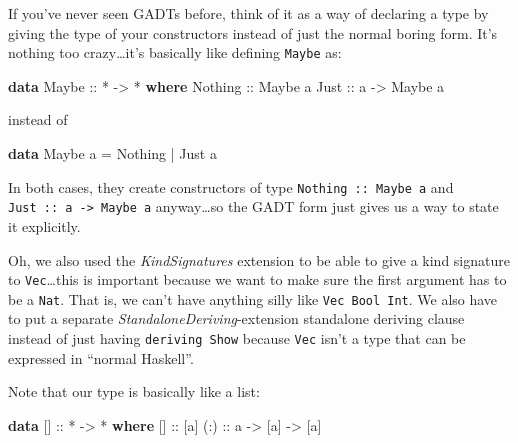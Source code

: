 \documentclass[]{article}
\newenvironment{Shaded}{}{}
\newcommand{\DataTypeTok}[1]{\textcolor[rgb]{0.56,0.13,0.00}{#1}}
\newcommand{\KeywordTok}[1]{\textcolor[rgb]{0.00,0.44,0.13}{\textbf{#1}}}
\newcommand{\NormalTok}[1]{#1}
\newcommand{\OperatorTok}[1]{\textcolor[rgb]{0.40,0.40,0.40}{#1}}
\newcommand{\OtherTok}[1]{\textcolor[rgb]{0.00,0.44,0.13}{#1}}
\begin{document}
If you've never seen GADTs before, think of it as a way of declaring a type by
giving the type of your constructors instead of just the normal boring form.
It's nothing too crazy\ldots it's basically like defining \texttt{Maybe} as:

\begin{Shaded}
\begin{Highlighting}[]
\KeywordTok{data} \DataTypeTok{Maybe}\OtherTok{ ::} \OperatorTok{*} \OtherTok{{-}\textgreater{}} \OperatorTok{*} \KeywordTok{where}
    \DataTypeTok{Nothing}\OtherTok{ ::} \DataTypeTok{Maybe}\NormalTok{ a}
    \DataTypeTok{Just}\OtherTok{    ::}\NormalTok{ a }\OtherTok{{-}\textgreater{}} \DataTypeTok{Maybe}\NormalTok{ a}
\end{Highlighting}
\end{Shaded}

instead of

\begin{Shaded}
\begin{Highlighting}[]
\KeywordTok{data} \DataTypeTok{Maybe}\NormalTok{ a }\OtherTok{=} \DataTypeTok{Nothing} \OperatorTok{|} \DataTypeTok{Just}\NormalTok{ a}
\end{Highlighting}
\end{Shaded}

In both cases, they create constructors of type \texttt{Nothing\ ::\ Maybe\ a}
and \texttt{Just\ ::\ a\ -\textgreater{}\ Maybe\ a} anyway\ldots so the GADT
form just gives us a way to state it explicitly.

Oh, we also used the \emph{KindSignatures} extension to be able to give a kind
signature to \texttt{Vec}\ldots this is important because we want to make sure
the first argument has to be a \texttt{Nat}. That is, we can't have anything
silly like \texttt{Vec\ Bool\ Int}. We also have to put a separate
\emph{StandaloneDeriving}-extension standalone deriving clause instead of just
having \texttt{deriving\ Show} because \texttt{Vec} isn't a type that can be
expressed in ``normal Haskell''.

Note that our type is basically like a list:

\begin{Shaded}
\begin{Highlighting}[]
\KeywordTok{data}\NormalTok{ []}\OtherTok{ ::} \OperatorTok{*} \OtherTok{{-}\textgreater{}} \OperatorTok{*} \KeywordTok{where}
\NormalTok{    []}\OtherTok{  ::}\NormalTok{ [a]}
\OtherTok{    (:) ::}\NormalTok{ a }\OtherTok{{-}\textgreater{}}\NormalTok{ [a] }\OtherTok{{-}\textgreater{}}\NormalTok{ [a]}
\end{Highlighting}
\end{Shaded}
\end{document}

